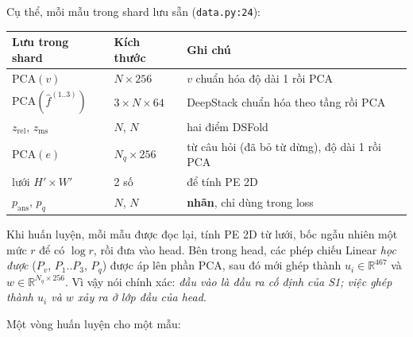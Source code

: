 \documentclass[11pt,a4paper]{article}
\newcommand{\R}{\mathbb{R}}
\newcommand{\softmax}{\operatorname{softmax}}
\newcommand{\file}[1]{\texttt{\small #1}}
\begin{document}
Cụ thể, mỗi mẫu trong shard lưu sẵn (\file{data.py:24}):
\begin{center}
\small
\begin{tabular}{@{}lll@{}}
\toprule
Lưu trong shard & Kích thước & Ghi chú\\
\midrule
$\mathrm{PCA}(v)$ & $N\times256$ & $v$ chuẩn hóa độ dài 1 rồi PCA\\
$\mathrm{PCA}(\hat f^{(1..3)})$ & $3\times N\times64$ & DeepStack chuẩn hóa theo tầng rồi PCA\\
$z_\text{rel}$, $z_\text{ms}$ & $N$, $N$ & hai điểm DSFold\\
$\mathrm{PCA}(e)$ & $N_q\times256$ & từ câu hỏi (đã bỏ từ dừng), độ dài 1 rồi PCA\\
lưới $H'\times W'$ & 2 số & để tính PE 2D\\
\midrule
$p_\text{ans}$, $p_q$ & $N$, $N$ & \textbf{nhãn}, chỉ dùng trong loss\\
\bottomrule
\end{tabular}
\end{center}
Khi huấn luyện, mỗi mẫu được đọc lại, tính PE 2D từ lưới, bốc ngẫu nhiên một mức $r$ để có $\log r$, rồi đưa vào head. Bên trong head, các phép chiếu Linear \emph{học được} ($P_v$, $P_1..P_3$, $P_q$) được áp lên phần PCA, sau đó mới ghép thành $u_i\in\R^{467}$ và $w\in\R^{N_q\times256}$. Vì vậy nói chính xác: \emph{đầu vào là đầu ra cố định của S1; việc ghép thành $u_i$ và $w$ xảy ra ở lớp đầu của head}.

Một vòng huấn luyện cho một mẫu:
\begin{center}
\end{center}
\end{document}
